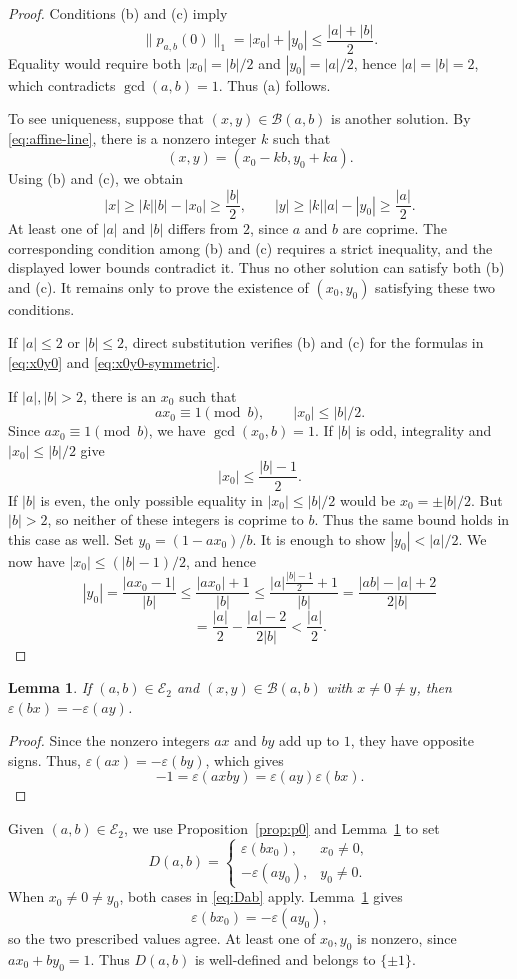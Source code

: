\documentclass[12pt,letterpaper]{article}
\numberwithin{equation}{section}
\newcommand{\B}{\mathcal B}
\newcommand{\E}{\mathcal E}
\newcommand{\eps}{\varepsilon}
\newcommand{\normone}[1]{\lVert #1\rVert_1}
\theoremstyle{plain}
\newtheorem{lemma}[theorem]{Lemma}
\theoremstyle{definition}
\begin{document}
\begin{proof}
Conditions (b) and (c) imply
\[
 \normone{p_{a,b}(0)}=|x_0|+|y_0|
 \le\frac{|a|+|b|}{2}.
\]
Equality would require both $|x_0|=|b|/2$ and $|y_0|=|a|/2$, hence $|a|=|b|=2$, which contradicts $\gcd(a,b)=1$. Thus (a) follows.

To see uniqueness, suppose that $(x,y)\in\B(a,b)$ is another solution. By \eqref{eq:affine-line}, there is a nonzero integer $k$ such that
\[
 (x,y)=(x_0-kb,y_0+ka).
\]
Using (b) and (c), we obtain
\[
 |x|\ge |k||b|-|x_0|\ge\frac{|b|}{2},
 \qquad
 |y|\ge |k||a|-|y_0|\ge\frac{|a|}{2}.
\]
At least one of $|a|$ and $|b|$ differs from $2$, since $a$ and $b$ are coprime. The corresponding condition among (b) and (c) requires a strict inequality, and the displayed lower bounds contradict it. Thus no other solution can satisfy both (b) and (c). It remains only to prove the existence of $(x_0,y_0)$ satisfying these two conditions.

If $|a|\le2$ or $|b|\le2$, direct substitution verifies (b) and (c) for the formulas in \eqref{eq:x0y0} and \eqref{eq:x0y0-symmetric}.

If $|a|,|b|>2$, there is an $x_0$ such that 
\[
 ax_0\equiv1\pmod b,\qquad |x_0|\le|b|/2.
\]
Since $ax_0\equiv1\pmod b$, we have $\gcd(x_0,b)=1$. If $|b|$ is odd, integrality and $|x_0|\le|b|/2$ give
\[
 |x_0|\le\frac{|b|-1}{2}.
\]
If $|b|$ is even, the only possible equality in $|x_0|\le|b|/2$ would be $x_0=\pm|b|/2$. But $|b|>2$, so neither of these integers is coprime to $b$. Thus the same bound holds in this case as well. Set $y_0=(1-ax_0)/b$. It is enough to show $|y_0|<|a|/2$. We now have $|x_0|\le(|b|-1)/2$, and hence
\[
 |y_0|=\frac{|ax_0-1|}{|b|}\le\frac{|ax_0|+1}{|b|}\le\frac{|a| \frac{|b|-1}{2} +1}{|b|}=\frac{|ab|-|a|+2}{2|b|}
\]
\[
 =\frac{|a|}{2}-\frac{|a|-2}{2|b|}<\frac{|a|}{2}.
\]
\end{proof}

\begin{lemma}\label{lem:Dab}
If $(a,b)\in\E_2$ and $(x,y)\in\B(a,b)$ with $x\ne0\ne y$, then $\eps(bx)=-\eps(ay)$.
\end{lemma}

\begin{proof}
Since the nonzero integers $ax$ and $by$ add up to $1$, they have opposite signs. Thus, $\eps(ax)=-\eps(by)$, which gives
\[
 -1=\eps(axby)=\eps(ay)\eps(bx).
\]
\end{proof}

Given $(a,b)\in\E_2$, we use Proposition~\ref{prop:p0} and Lemma~\ref{lem:Dab} to set   
\begin{equation}\label{eq:Dab}
 D(a,b)=
 \begin{cases}
  \eps(bx_0),&x_0\ne0,\\
  -\eps(ay_0),&y_0\ne0.
 \end{cases}
\end{equation}
When $x_0\ne0\ne y_0$, both cases in \eqref{eq:Dab} apply. Lemma~\ref{lem:Dab} gives
\[
 \eps(bx_0)=-\eps(ay_0),
\]
so the two prescribed values agree. At least one of $x_0,y_0$ is nonzero, since $ax_0+by_0=1$. Thus $D(a,b)$ is well-defined and belongs to $\{\pm1\}$.
\end{document}
